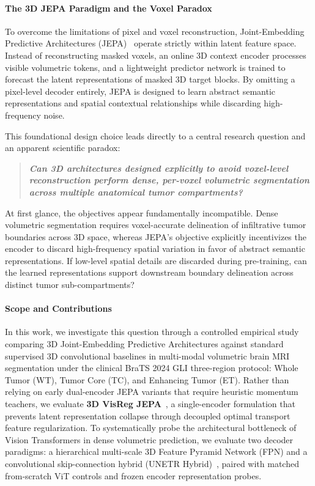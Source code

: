 \documentclass{article}
\begin{document}
\paragraph{The 3D JEPA Paradigm and the Voxel Paradox}
To overcome the limitations of pixel and voxel reconstruction, Joint-Embedding Predictive Architectures (JEPA)~\citep{assran2023ijepa,lecun2022path} operate strictly within latent feature space. Instead of reconstructing masked voxels, an online 3D context encoder processes visible volumetric tokens, and a lightweight predictor network is trained to forecast the latent representations of masked 3D target blocks. By omitting a pixel-level decoder entirely, JEPA is designed to learn abstract semantic representations and spatial contextual relationships while discarding high-frequency noise.

This foundational design choice leads directly to a central research question and an apparent scientific paradox:
\begin{quote}
\centering
\textbf{\emph{Can 3D architectures designed explicitly to avoid voxel-level reconstruction perform dense, per-voxel volumetric segmentation across multiple anatomical tumor compartments?}}
\end{quote}
At first glance, the objectives appear fundamentally incompatible. Dense volumetric segmentation requires voxel-accurate delineation of infiltrative tumor boundaries across 3D space, whereas JEPA's objective explicitly incentivizes the encoder to discard high-frequency spatial variation in favor of abstract semantic representations. If low-level spatial details are discarded during pre-training, can the learned representations support downstream boundary delineation across distinct tumor sub-compartments?

\newpage
\paragraph{Scope and Contributions}
In this work, we investigate this question through a controlled empirical study comparing 3D Joint-Embedding Predictive Architectures against standard supervised 3D convolutional baselines in multi-modal volumetric brain MRI segmentation under the clinical BraTS 2024 GLI three-region protocol: Whole Tumor (WT), Tumor Core (TC), and Enhancing Tumor (ET). Rather than relying on early dual-encoder JEPA variants that require heuristic momentum teachers, we evaluate \textbf{3D VisReg JEPA}~\citep{wu2026visreg}, a single-encoder formulation that prevents latent representation collapse through decoupled optimal transport feature regularization. To systematically probe the architectural bottleneck of Vision Transformers in dense volumetric prediction, we evaluate two decoder paradigms: a hierarchical multi-scale 3D Feature Pyramid Network (FPN) and a convolutional skip-connection hybrid (UNETR Hybrid)~\citep{hatamizadeh2022unetr}, paired with matched from-scratch ViT controls and frozen encoder representation probes.
\end{document}
